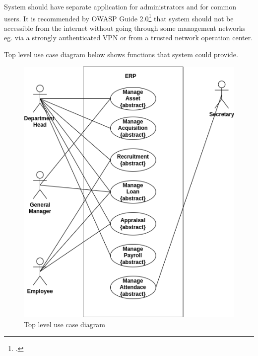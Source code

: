 System should have separate application for administrators and for common users. It is recommended by OWASP Guide 2.0\footcite{https://www.owasp.org} that system should not be accessible from  the internet without going through some management networks eg. via a strongly authenticated VPN or from a trusted network operation center.

Top level use case diagram below shows functions that system could provide.

\begin{figure}[!hb]
\includegraphics[width=15cm,keepaspectratio]{usecases/top_level_usecase.drawio.png}
\caption{Top level use case diagram}
\end{figure}
\clearpage

